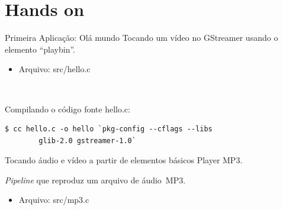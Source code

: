 \documentclass{beamer}
\def\en#1{\foreignlanguage{english}{\emph{#1}}}
\begin{document}
\section{Hands on}
\begin{frame}[fragile]{Primeira Aplicação: Olá mundo}
  Tocando um vídeo no GStreamer usando o elemento ``playbin''.
  \begin{itemize}
    \item Arquivo: src/hello.c
  \end{itemize}
  ~
  
  Compilando o código fonte hello.c:
  \begin{lstlisting}[style=command]
  $ cc hello.c -o hello `pkg-config --cflags --libs 
        glib-2.0 gstreamer-1.0`
  \end{lstlisting}
\end{frame}

\begin{frame}[c]{Tocando áudio e vídeo a partir de elementos básicos}
  Player MP3.
  \begin{figure}[t]
    \centering
  \end{figure}
  \en{Pipeline} que reproduz um arquivo de áudio~MP3.
  ~
  \begin{itemize}
    \item Arquivo: src/mp3.c
  \end{itemize}
\end{frame}
\end{document}
